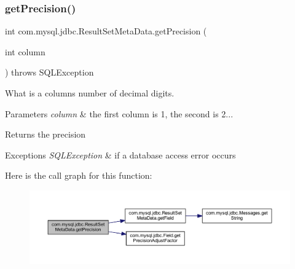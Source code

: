 \mbox{\label{classcom_1_1mysql_1_1jdbc_1_1_result_set_meta_data_a205a18c21baf8e3815dc3d252229abc4}} 
\subsubsection{\texorpdfstring{get\+Precision()}{getPrecision()}}
{\footnotesize\ttfamily int com.\+mysql.\+jdbc.\+Result\+Set\+Meta\+Data.\+get\+Precision (\begin{DoxyParamCaption}\item[{int}]{column }\end{DoxyParamCaption}) throws S\+Q\+L\+Exception}

What is a column\textquotesingle{}s number of decimal digits.


\begin{DoxyParams}{Parameters}
{\em column} & the first column is 1, the second is 2...\\
\hline
\end{DoxyParams}
\begin{DoxyReturn}{Returns}
the precision
\end{DoxyReturn}

\begin{DoxyExceptions}{Exceptions}
{\em S\+Q\+L\+Exception} & if a database access error occurs \\
\hline
\end{DoxyExceptions}
Here is the call graph for this function\+:
\nopagebreak
\begin{figure}[H]
\begin{center}
\leavevmode
\includegraphics[width=350pt]{classcom_1_1mysql_1_1jdbc_1_1_result_set_meta_data_a205a18c21baf8e3815dc3d252229abc4_cgraph}
\end{center}
\end{figure}
\mbox{\label{classcom_1_1mysql_1_1jdbc_1_1_result_set_meta_data_a758eaa931a2255393d83a424546c5b1b}} 
